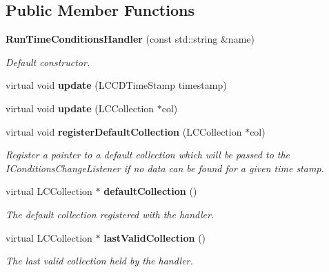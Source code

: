 \subsection*{Public Member Functions}
\begin{DoxyCompactItemize}
\item 
{\bf Run\-Time\-Conditions\-Handler} (const std\-::string \&name)
\begin{DoxyCompactList}\small\item\em Default constructor. \end{DoxyCompactList}\item 
virtual void {\bfseries update} (L\-C\-C\-D\-Time\-Stamp timestamp)\label{classCALICE_1_1RunTimeConditionsHandler_a2512774ec5cc836083d0e33d5bdf2bc2}

\item 
virtual void {\bfseries update} (L\-C\-Collection $\ast$col)\label{classCALICE_1_1RunTimeConditionsHandler_a05f4714fa0493f98faeb3efa8b6fce1e}

\item 
virtual void {\bf register\-Default\-Collection} (L\-C\-Collection $\ast$col)\label{classCALICE_1_1RunTimeConditionsHandler_a40b4326a9b931702afdd3bd6f6cdad31}

\begin{DoxyCompactList}\small\item\em Register a pointer to a default collection which will be passed to the I\-Conditions\-Change\-Listener if no data can be found for a given time stamp. \end{DoxyCompactList}\item 
virtual L\-C\-Collection $\ast$ {\bf default\-Collection} ()\label{classCALICE_1_1RunTimeConditionsHandler_a211c66b829f2f9942612667b04da119b}

\begin{DoxyCompactList}\small\item\em The default collection registered with the handler. \end{DoxyCompactList}\item 
virtual L\-C\-Collection $\ast$ {\bf last\-Valid\-Collection} ()\label{classCALICE_1_1RunTimeConditionsHandler_a0867758af207626a60529ab86ea9fd64}

\begin{DoxyCompactList}\small\item\em The last valid collection held by the handler. \end{DoxyCompactList}\end{DoxyCompactItemize}
